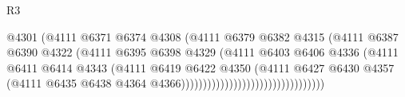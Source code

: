 \begin{lexlean}{R3}
\begin{coremodule}
                                                    @4301
                                                    (@4111
                                                      @6371
                                                      @6374
                                                      @4308
                                                      (@4111
                                                        @6379
                                                        @6382
                                                        @4315
                                                        (@4111
                                                          @6387
                                                          @6390
                                                          @4322
                                                          (@4111
                                                            @6395
                                                            @6398
                                                            @4329
                                                            (@4111
                                                              @6403
                                                              @6406
                                                              @4336
                                                              (@4111
                                                                @6411
                                                                @6414
                                                                @4343
                                                                (@4111
                                                                  @6419
                                                                  @6422
                                                                  @4350
                                                                  (@4111
                                                                    @6427
                                                                    @6430
                                                                    @4357
                                                                    (@4111
                                                                      @6435
                                                                      @6438
                                                                      @4364
                                                                      @4366)))))))))))))))))))))))))))))))))

\end{coremodule}
\end{lexlean}
